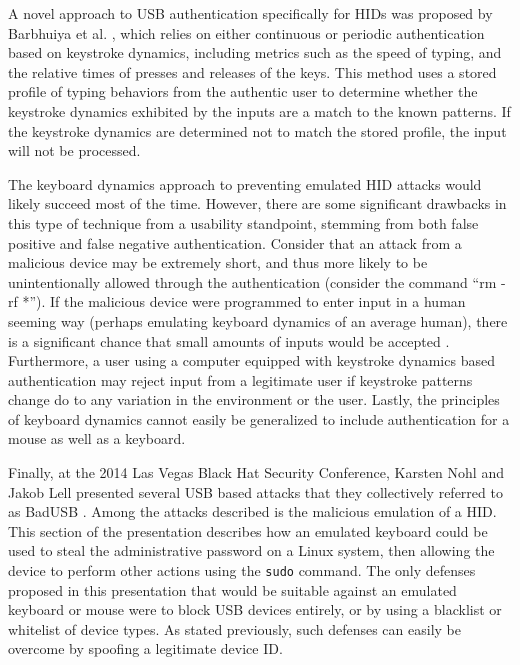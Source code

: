 \documentclass[pagenumbers]{ieee}
\begin{document}
A novel approach to USB authentication specifically for HIDs was proposed by Barbhuiya et al. \cite{barbhuiya}, which relies on either continuous or periodic authentication based on keystroke dynamics, including metrics such as the speed of typing, and the relative times of presses and releases of the keys. This method uses a stored profile of typing behaviors from the authentic user to determine whether the keystroke dynamics exhibited by the inputs are a match to the known patterns. If the keystroke dynamics are determined not to match the stored profile, the input will not be processed.

The keyboard dynamics approach to preventing emulated HID attacks would likely succeed most of the time. However, there are some significant drawbacks in this type of technique from a usability standpoint, stemming from both false positive and false negative authentication. Consider that an attack from a malicious device may be extremely short, and thus more likely to be unintentionally allowed through the authentication (consider the command ``rm -rf *''). If the malicious device were programmed to enter input in a human seeming way (perhaps emulating keyboard dynamics of an average human), there is a significant chance that small amounts of inputs would be accepted \cite{shahzad}. Furthermore, a user using a computer equipped with keystroke dynamics based authentication may reject input from a legitimate user if keystroke patterns change do to any variation in the environment or the user. Lastly, the principles of keyboard dynamics cannot easily be generalized to include authentication for a mouse as well as a keyboard.

Finally, at the 2014 Las Vegas Black Hat Security Conference, Karsten Nohl and Jakob Lell presented several USB based attacks that they collectively referred to as BadUSB \cite{nohl}. Among the attacks described is the malicious emulation of a HID. This section of the presentation describes how an emulated keyboard could be used to steal the administrative password on a Linux system, then allowing the device to perform other actions using the \texttt{sudo} command. The only defenses proposed in this presentation that would be suitable against an emulated keyboard or mouse were to block USB devices entirely, or by using a blacklist or whitelist of device types. As stated previously, such defenses can easily be overcome by spoofing a legitimate device ID.

\end{document}

